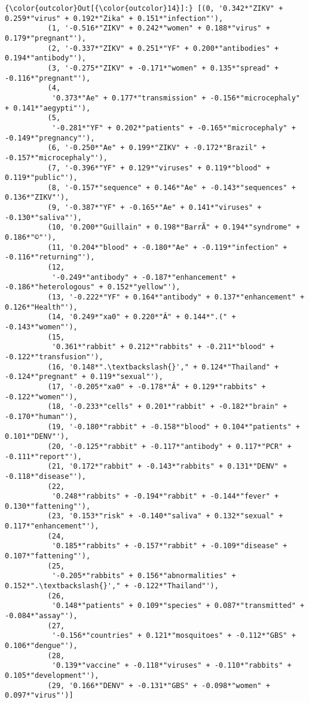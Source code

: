 \documentclass[11pt]{article}
\begin{document}
            \begin{Verbatim}[commandchars=\\\{\}]
{\color{outcolor}Out[{\color{outcolor}14}]:} [(0, '0.342*"ZIKV" + 0.259*"virus" + 0.192*"Zika" + 0.151*"infection"'),
          (1, '-0.516*"ZIKV" + 0.242*"women" + 0.188*"virus" + 0.179*"pregnant"'),
          (2, '-0.337*"ZIKV" + 0.251*"YF" + 0.200*"antibodies" + 0.194*"antibody"'),
          (3, '-0.275*"ZIKV" + -0.171*"women" + 0.135*"spread" + -0.116*"pregnant"'),
          (4,
           '0.373*"Ae" + 0.177*"transmission" + -0.156*"microcephaly" + 0.141*"aegypti"'),
          (5,
           '-0.281*"YF" + 0.202*"patients" + -0.165*"microcephaly" + -0.149*"pregnancy"'),
          (6, '-0.250*"Ae" + 0.199*"ZIKV" + -0.172*"Brazil" + -0.157*"microcephaly"'),
          (7, '-0.396*"YF" + 0.129*"viruses" + 0.119*"blood" + 0.119*"public"'),
          (8, '-0.157*"sequence" + 0.146*"Ae" + -0.143*"sequences" + 0.136*"ZIKV"'),
          (9, '-0.387*"YF" + -0.165*"Ae" + 0.141*"viruses" + -0.130*"saliva"'),
          (10, '0.200*"Guillain" + 0.198*"BarrÃ" + 0.194*"syndrome" + 0.186*"©"'),
          (11, '0.204*"blood" + -0.180*"Ae" + -0.119*"infection" + -0.116*"returning"'),
          (12,
           '-0.249*"antibody" + -0.187*"enhancement" + -0.186*"heterologous" + 0.152*"yellow"'),
          (13, '-0.222*"YF" + 0.164*"antibody" + 0.137*"enhancement" + 0.126*"Health"'),
          (14, '0.249*"xa0" + 0.220*"Â" + 0.144*".(" + -0.143*"women"'),
          (15,
           '0.361*"rabbit" + 0.212*"rabbits" + -0.211*"blood" + -0.122*"transfusion"'),
          (16, '0.148*".\textbackslash{}'," + 0.124*"Thailand" + -0.124*"pregnant" + 0.119*"sexual"'),
          (17, '-0.205*"xa0" + -0.178*"Â" + 0.129*"rabbits" + -0.122*"women"'),
          (18, '-0.233*"cells" + 0.201*"rabbit" + -0.182*"brain" + -0.170*"human"'),
          (19, '-0.180*"rabbit" + -0.158*"blood" + 0.104*"patients" + 0.101*"DENV"'),
          (20, '-0.125*"rabbit" + -0.117*"antibody" + 0.117*"PCR" + -0.111*"report"'),
          (21, '0.172*"rabbit" + -0.143*"rabbits" + 0.131*"DENV" + -0.118*"disease"'),
          (22,
           '0.248*"rabbits" + -0.194*"rabbit" + -0.144*"fever" + 0.130*"fattening"'),
          (23, '0.153*"risk" + -0.140*"saliva" + 0.132*"sexual" + 0.117*"enhancement"'),
          (24,
           '0.185*"rabbits" + -0.157*"rabbit" + -0.109*"disease" + 0.107*"fattening"'),
          (25,
           '-0.205*"rabbits" + 0.156*"abnormalities" + 0.152*".\textbackslash{}'," + -0.122*"Thailand"'),
          (26,
           '0.148*"patients" + 0.109*"species" + 0.087*"transmitted" + -0.084*"assay"'),
          (27,
           '-0.156*"countries" + 0.121*"mosquitoes" + -0.112*"GBS" + 0.106*"dengue"'),
          (28,
           '0.139*"vaccine" + -0.118*"viruses" + -0.110*"rabbits" + 0.105*"development"'),
          (29, '0.166*"DENV" + -0.131*"GBS" + -0.098*"women" + 0.097*"virus"')]
\end{Verbatim}
        
\end{document}
